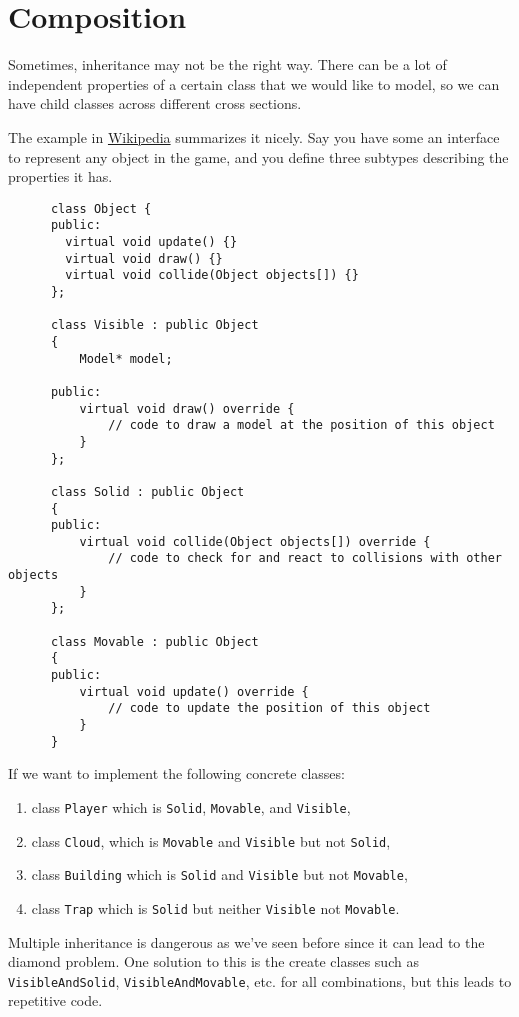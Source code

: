 \section{Composition} 

  Sometimes, inheritance may not be the right way. There can be a lot of independent properties of a certain class that we would like to model, so we can have child classes across different cross sections. 

  \begin{example}
    The example in \href{https://en.wikipedia.org/wiki/Composition_over_inheritance#Example}{Wikipedia} summarizes it nicely. Say you have some an interface to represent any object in the game, and you define three subtypes describing the properties it has. 

    \begin{lstlisting}
      class Object {
      public:
        virtual void update() {}
        virtual void draw() {}
        virtual void collide(Object objects[]) {}
      };

      class Visible : public Object
      {
          Model* model;

      public:
          virtual void draw() override {
              // code to draw a model at the position of this object
          }
      };

      class Solid : public Object
      {
      public:
          virtual void collide(Object objects[]) override {
              // code to check for and react to collisions with other objects
          }
      };

      class Movable : public Object
      {
      public:
          virtual void update() override {
              // code to update the position of this object
          } 
      } 
    \end{lstlisting} 

    If we want to implement the following concrete classes: 
    \begin{enumerate}
      \item class \texttt{Player} which is \texttt{Solid}, \texttt{Movable}, and \texttt{Visible}, 
      \item class \texttt{Cloud}, which is \texttt{Movable} and \texttt{Visible} but not \texttt{Solid}, 
      \item class \texttt{Building} which is \texttt{Solid} and \texttt{Visible} but not \texttt{Movable}, 
      \item class \texttt{Trap} which is \texttt{Solid} but neither \texttt{Visible} not \texttt{Movable}. 
    \end{enumerate} 
    Multiple inheritance is dangerous as we've seen before since it can lead to the diamond problem. One solution to this is the create classes such as \texttt{VisibleAndSolid}, \texttt{VisibleAndMovable}, etc. for all combinations, but this leads to repetitive code. 
  \end{example}

